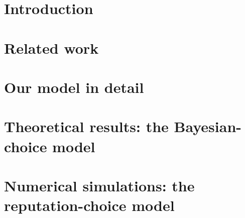 \documentclass[11pt]{article}
\newcommand{\TheoryModel}{Bayesian-choice model\xspace}
\newcommand{\ExptsModel}{reputation-choice model\xspace}
\begin{document}
\section{Introduction}
\label{sec:intro}



\newpage
\section{Related work}
\label{sec:related-work}


\section{Our model in detail}
\label{sec:model}


\newpage
\section{Theoretical results: the \TheoryModel}
\label{sec:theory}



%

%

%

%

\section{Numerical simulations: the \ExptsModel}
\label{sec:sim}
\end{document}
